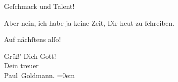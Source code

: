                Geſchmack und Talent!\pend
           
\pstart
           Aber nein, ich habe  ja keine Zeit, Dir heut zu{ }ſchreiben.\pend
           
\pstart
           Auf nächſtens alſo!\pend
           
\pstart
           Grüß’ Dich Gott! {\\[\baselineskip]}Dein treuer {\\[\baselineskip]}\spacefill\mbox{Paul Goldmann.}\pend
           \leftskip=0em{}\endnumbering{}  \newcommand{\dateiname}{L02732}\newcommand{\titel}{Paul Goldmann an Arthur Schnitzler, 28. 3. [1895]}\newcommand{\editorInnen}{Martin Anton Müller und Laura Untner}
